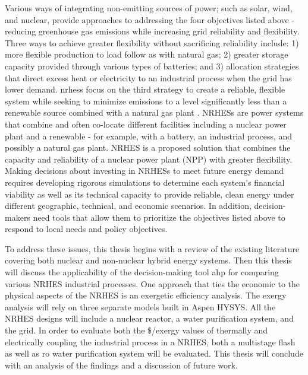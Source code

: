 Various ways of integrating non-emitting sources of power; such as solar, wind, and nuclear, provide approaches to addressing the four objectives listed above - reducing greenhouse gas emissions while increasing grid reliability and flexibility. Three ways to achieve greater flexibility without sacrificing reliability include: 1) more flexible production to load follow as with natural gas; 2) greater storage capacity provided through various types of batteries; and 3)  allocation strategies that direct excess heat or electricity to an industrial process when the grid has lower demand. \ac{nrhess} focus on the third strategy to create a reliable, flexible system while seeking to minimize emissions to a level significantly less than a renewable source combined with a natural gas plant \cite{Baker2016}. NRHESs are power systems that combine and often co-locate different facilities including a nuclear power plant and a renewable - for example, with a battery, an industrial process, and possibly a natural gas plant.  NRHES is a proposed solution that combines the capacity and reliability of a nuclear power plant (NPP) with greater flexibility.
Making decisions about investing in NRHESs to meet future energy demand requires developing rigorous simulations to determine each system's financial viability as well as its technical capacity to provide reliable, clean energy under different geographic, technical, and economic scenarios. In addition, decision-makers need tools that allow them to prioritize the objectives listed above to respond to local needs and policy objectives.


To address these issues, this thesis begins with a review of the existing literature covering both nuclear and non-nuclear hybrid energy systems.  Then this thesis will discuss the applicability of the decision-making tool \ac{ahp} for comparing various NRHES industrial processes. One approach that ties the economic to the physical aspects of the NRHES is an exergetic efficiency analysis. The exergy analysis will rely on three separate models built in Aspen HYSYS. All the NRHES designs will include a nuclear reactor, a water purification system, and the grid. In order to evaluate both the \$/exergy values of thermally and electrically coupling the industrial process in a NRHES, both a multistage flash as well as \ac{ro} water purification system will be evaluated.  This thesis will conclude with an analysis of the findings and a discussion of future work.
